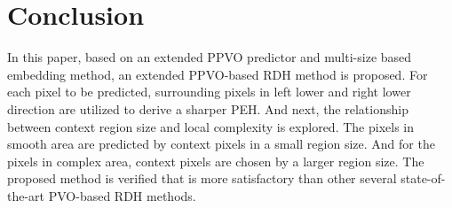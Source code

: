 \documentclass[review,3p,10pt,sort&compress]{elsarticle}
\begin{document}

\section{Conclusion}\label{sec:5}
In this paper, based on an extended PPVO predictor and multi-size based embedding method, an extended PPVO-based RDH method is proposed. For each pixel to be predicted, surrounding pixels in left lower and right lower direction are utilized to derive a sharper PEH. And next, the relationship between context region size and local complexity is explored. The pixels in smooth area are predicted by context pixels in a small region size. And for the pixels in complex area, context pixels are chosen by a larger region size. The proposed method is verified that is more satisfactory than other several state-of-the-art PVO-based RDH methods.
\end{document}
